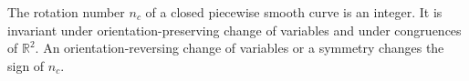 The rotation number $n_c$ of a closed piecewise smooth curve is an integer. It is invariant under orientation-preserving change of variables and under congruences of $\mathbb{R}^2$. An orientation-reversing change of variables or a symmetry changes the sign of $n_c$.